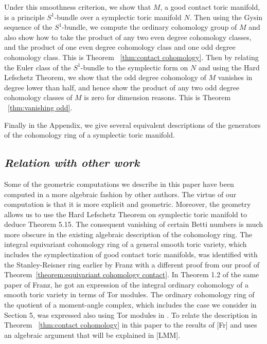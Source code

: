 \documentclass[12pt]{amsart}
\theoremstyle{definition}
\numberwithin{equation}{section}
\begin{document}
Under this smoothness criterion, we show that $M$, a good contact
toric manifold, is a principle $S^1$-bundle over a symplectic toric
manifold $N$. Then using the Gysin sequence of the $S^1$-bundle, we
compute the ordinary cohomology group of $M$ and also show how to
take the product of any two even degree cohomology classes, and the
product of one even degree cohomology class and one odd degree
cohomology class. This is Theorem ~\ref{thm:contact cohomology}.
Then by relating the Euler class of the $S^1$-bundle to the
symplectic form on $N$ and using the Hard Lefschetz Theorem, we show
that the odd degree cohomology of $M$ vanishes in degree lower than
half, and hence show the product of any two odd degree cohomology
classes of $M$ is zero for dimension reasons. This is Theorem
~\ref{thm:vanishing odd}.


Finally in the Appendix, we give several equivalent descriptions of
the generators of the cohomology ring of a symplectic toric
manifold.
\subsection{\it Relation with other work}

Some of the geometric computations we describe in this paper have
been computed in a more algebraic fashion by other authors. The
virtue of our computation is that it is more explicit and geometric.
Moreover, the geometry allows us to use the Hard Lefschetz Theorem
on symplectic toric manifold to deduce Theorem 5.15. The consequent
vanishing of certain Betti numbers is much more obscure in the
existing algebraic description of the cohomology ring. The integral
equivariant cohomology ring of a general smooth toric variety, which
includes the symplectization of good contact toric manifolds, was
identified with the Stanley-Reisner ring earlier by Franz
\cite[Sec.\ 3]{Franz} with a different proof from our proof of
Theorem~\ref{theorem:equivariant cohomology contact}. In Theorem 1.2
of the same paper of Franz, he got an expression of the integral
ordinary cohomology of a smooth toric variety in terms of Tor
modules. The ordinary cohomology ring of the quotient of a
moment-angle complex, which includes the case we consider in Section
5, was expressed also using Tor modules in \cite[Thm.7.37]{BP}. To
relate the description in Theorem ~\ref{thm:contact cohomology} in
this paper to the results of [Fr] and \cite{BP} uses an algebraic
argument that will be explained in [LMM].

 \
\end{document}
